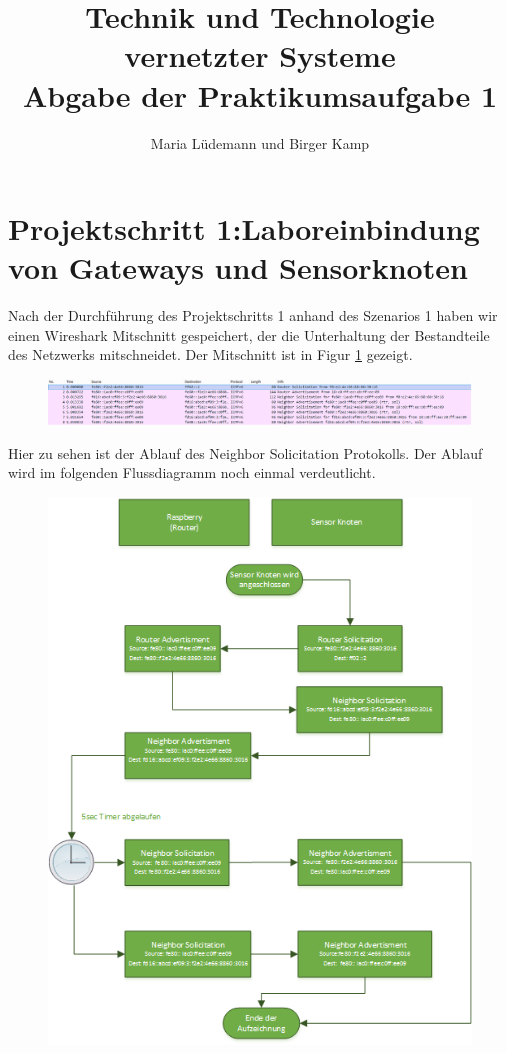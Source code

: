 \documentclass[]{scrartcl}
\title{Technik und Technologie vernetzter Systeme  \\ Abgabe der Praktikumsaufgabe 1}
\author{Maria Lüdemann und Birger Kamp}
\begin{document}
\maketitle

\section{Projektschritt 1:Laboreinbindung von Gateways und Sensorknoten}
Nach der Durchführung des Projektschritts 1 anhand des Szenarios 1 haben wir einen Wireshark Mitschnitt gespeichert, der die Unterhaltung der Bestandteile des Netzwerks mitschneidet. Der Mitschnitt ist in Figur \ref{fig:wireshark_1} gezeigt.

\begin{figure}[H]
	\centering
	\includegraphics[width=1\linewidth]{wireshark_1.png}
	\label{fig:wireshark_1}
\end{figure}

Hier zu sehen ist der Ablauf des Neighbor Solicitation Protokolls. Der Ablauf wird im folgenden Flussdiagramm noch einmal verdeutlicht. 


\begin{figure}[H]
	\centering
	\includegraphics[width=1\linewidth]{flussdiagramm.png}
	\label{fig:flussdiagramm}
\end{figure}
\end{document}
